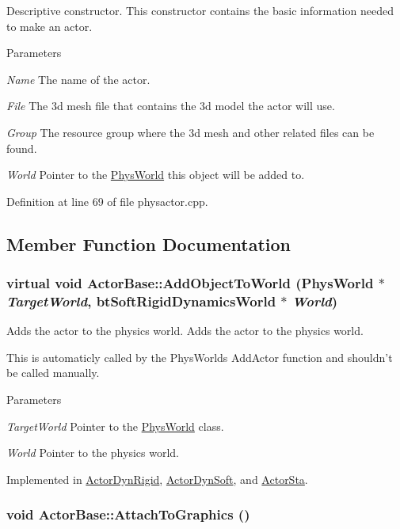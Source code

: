 Descriptive constructor. This constructor contains the basic information needed to make an actor. 
\begin{DoxyParams}{Parameters}
\item[{\em Name}]The name of the actor. \item[{\em File}]The 3d mesh file that contains the 3d model the actor will use. \item[{\em Group}]The resource group where the 3d mesh and other related files can be found. \item[{\em World}]Pointer to the \hyperlink{classPhysWorld}{PhysWorld} this object will be added to. \end{DoxyParams}


Definition at line 69 of file physactor.cpp.

\subsection{Member Function Documentation}
\hypertarget{classActorBase_a1af82a2ed960fd114518fdf84d5ff146}{
\subsubsection[{AddObjectToWorld}]{\setlength{\rightskip}{0pt plus 5cm}virtual void ActorBase::AddObjectToWorld ({\bf PhysWorld} $\ast$ {\em TargetWorld}, \/  btSoftRigidDynamicsWorld $\ast$ {\em World})}}
\label{dd/d7b/classActorBase_a1af82a2ed960fd114518fdf84d5ff146}


Adds the actor to the physics world. Adds the actor to the physics world. \par
 This is automaticly called by the PhysWorlds AddActor function and shouldn't be called manually. 
\begin{DoxyParams}{Parameters}
\item[{\em TargetWorld}]Pointer to the \hyperlink{classPhysWorld}{PhysWorld} class. \item[{\em World}]Pointer to the physics world. \end{DoxyParams}


Implemented in \hyperlink{classActorDynRigid_a45c054918362b86d829398384e316ed8}{ActorDynRigid}, \hyperlink{classActorDynSoft_ab56b961689401e16962d653b977e5fd6}{ActorDynSoft}, and \hyperlink{classActorSta_acd11f1ee404ab71d49d8fd4a810f2931}{ActorSta}.\hypertarget{classActorBase_afab604970fede16ccde0c6b8e72d9ee0}{
\subsubsection[{AttachToGraphics}]{\setlength{\rightskip}{0pt plus 5cm}void ActorBase::AttachToGraphics ()}}
\label{dd/d7b/classActorBase_afab604970fede16ccde0c6b8e72d9ee0}


